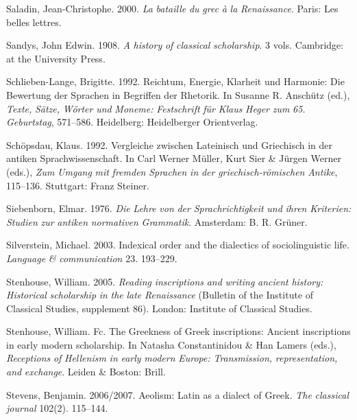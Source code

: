 Saladin, Jean-Christophe. 2000. \textit{La} \textit{bataille} \textit{du} \textit{grec} \textit{à} \textit{la} \textit{Renaissance}. Paris: Les belles lettres.

Sandys, John Edwin. 1908. \textit{A} \textit{history} \textit{of} \textit{classical} \textit{scholarship}. 3 vols. Cambridge: at the University Press.

Schlieben-Lange, Brigitte. 1992. Reichtum, Energie, Klarheit und Harmonie: Die Bewertung der Sprachen in Begriffen der Rhetorik. In Susanne R. Anschütz (ed.), \textit{Texte,} \textit{Sätze,} \textit{Wörter} \textit{und} \textit{Moneme:} \textit{Festschrift} \textit{für} \textit{Klaus} \textit{Heger} \textit{zum} \textit{65.} \textit{Geburtstag}, 571–586. Heidelberg: Heidelberger Orientverlag.

Schöpsdau, Klaus. 1992. Vergleiche zwischen Lateinisch und Griechisch in der antiken Sprachwissenschaft. In Carl Werner Müller, Kurt Sier \& Jürgen Werner (eds.), \textit{Zum} \textit{Umgang} \textit{mit} \textit{fremden} \textit{Sprachen} \textit{in} \textit{der} \textit{griechisch-römischen} \textit{Antike}, 115–136. Stuttgart: Franz Steiner.

Siebenborn, Elmar. 1976. \textit{Die} \textit{Lehre} \textit{von} \textit{der} \textit{Sprachrichtigkeit} \textit{und} \textit{ihren} \textit{Kriterien:} \textit{Studien} \textit{zur} \textit{antiken} \textit{normativen} \textit{Grammatik}. Amsterdam: B. R. Grüner.

Silverstein, Michael. 2003. Indexical order and the dialectics of sociolinguistic life. \textit{Language} \textit{\&} \textit{communication} 23. 193–229.

Stenhouse, William. 2005. \textit{Reading} \textit{inscriptions} \textit{and} \textit{writing} \textit{ancient} \textit{history:} \textit{Historical} \textit{scholarship} \textit{in} \textit{the} \textit{late} \textit{Renaissance} (Bulletin of the Institute of Classical Studies, supplement 86). London: Institute of Classical Studies.

Stenhouse, William. Fc. The Greekness of Greek inscriptions: Ancient inscriptions in early modern scholarship. In Natasha Constantinidou \& Han Lamers (eds.), \textit{Receptions} \textit{of} \textit{Hellenism} \textit{in} \textit{early} \textit{modern} \textit{Europe:} \textit{Transmission,} \textit{representation,} \textit{and} \textit{exchange}. Leiden \& Boston: Brill.

Stevens, Benjamin. 2006/2007. Aeolism: Latin as a dialect of Greek. \textit{The} \textit{classical} \textit{journal} 102(2). 115–144.

